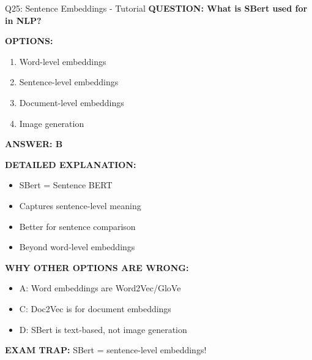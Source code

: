 \documentclass[8pt]{beamer}
\begin{document}
	\begin{frame}{Q25: Sentence Embeddings - Tutorial}
		\fontsize{6.5}{7.5}\selectfont
		\textbf{QUESTION: What is SBert used for in NLP?}
		
		\vspace{0.1cm}
		\textbf{OPTIONS:}
		\begin{enumerate}
			\item Word-level embeddings
			\item Sentence-level embeddings
			\item Document-level embeddings
			\item Image generation
		\end{enumerate}
		
		\vspace{0.1cm}
		\textcolor{myblue}{\textbf{ANSWER: B}}
		
		\vspace{0.1cm}
		\textbf{DETAILED EXPLANATION:}
		\begin{itemize}
			\item SBert = Sentence BERT
			\item Captures sentence-level meaning
			\item Better for sentence comparison
			\item Beyond word-level embeddings
		\end{itemize}
		
		\vspace{0.1cm}
		\textcolor{myred}{\textbf{WHY OTHER OPTIONS ARE WRONG:}}
		\begin{itemize}
			\item \textcolor{myred}{A:} Word embeddings are Word2Vec/GloVe
			\item \textcolor{myred}{C:} Doc2Vec is for document embeddings
			\item \textcolor{myred}{D:} SBert is text-based, not image generation
		\end{itemize}
		
		\textcolor{myred}{\textbf{EXAM TRAP:}} SBert = \textcolor{myblue}{sentence-level embeddings}!
	\end{frame}
	
	
\end{document}
